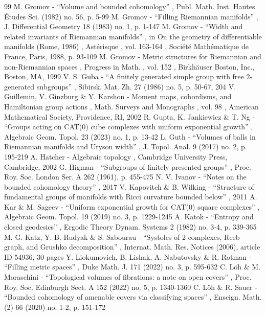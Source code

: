 \documentclass[11pt]{article}
\theoremstyle{definition}
\numberwithin{equation}{section}
\begin{document}
\begin{thebibliography}{99}
 M. Gromov - “Volume and bounded cohomology” , Publ. Math. Inst. Hautes Études Sci. (1982) no. 56, p. 5-99
 M. Gromov - “Filling Riemannian manifolds” , J. Differential Geometry 18 (1983) no. 1, p. 1-147
 M. Gromov - “Width and related invariants of Riemannian manifolds” , in On the geometry of differentiable manifolds (Rome, 1986) , Astérisque , vol. 163-164 , Société Mathématique de France, Paris, 1988, p. 93-109
 M. Gromov - Metric structures for Riemannian and non-Riemannian spaces , Progress in Math. , vol. 152 , Birkhäuser Boston, Inc., Boston, MA, 1999
 V. S. Guba - “A finitely generated simple group with free $2$-generated subgroups” , Sibirsk. Mat. Zh. 27 (1986) no. 5, p. 50-67, 204
 V. Guillemin, V. Ginzburg \& Y. Karshon - Moment maps, cobordisms, and Hamiltonian group actions , Math. Surveys and Monographs , vol. 98 , American Mathematical Society, Providence, RI, 2002
 R. Gupta, K. Jankiewicz \& T. Ng - “Groups acting on CAT(0) cube complexes with uniform exponential growth” , Algebraic Geom. Topol. 23 (2023) no. 1, p. 13-42
 L. Guth - “Volumes of balls in Riemannian manifolds and Uryson width” , J. Topol. Anal. 9 (2017) no. 2, p. 195-219
 A. Hatcher - Algebraic topology , Cambridge University Press, Cambridge, 2002
 G. Higman - “Subgroups of finitely presented groups” , Proc. Roy. Soc. London Ser. A 262 (1961), p. 455-475
 N. V. Ivanov - “Notes on the bounded cohomology theory” , 2017
 V. Kapovitch \& B. Wilking - “Structure of fundamental groups of manifolds with Ricci curvature bounded below” , 2011
 A. Kar \& M. Sageev - “Uniform exponential growth for CAT(0) square complexes” , Algebraic Geom. Topol. 19 (2019) no. 3, p. 1229-1245
 A. Katok - “Entropy and closed geodesics” , Ergodic Theory Dynam. Systems 2 (1982) no. 3-4, p. 339-365
 M. G. Katz, Y. B. Rudyak \& S. Sabourau - “Systoles of 2-complexes, Reeb graph, and Grushko decomposition” , Internat. Math. Res. Notices (2006), article ID 54936, 30 pages
 Y. Liokumovich, B. Lishak, A. Nabutovsky \& R. Rotman - “Filling metric spaces” , Duke Math. J. 171 (2022) no. 3, p. 595-632
 C. Löh \& M. Moraschini - “Topological volumes of fibrations: a note on open covers” , Proc. Roy. Soc. Edinburgh Sect. A 152 (2022) no. 5, p. 1340-1360
 C. Löh \& R. Sauer - “Bounded cohomology of amenable covers via classifying spaces” , Enseign. Math. (2) 66 (2020) no. 1-2, p. 151-172

\end{thebibliography}
\end{document}
